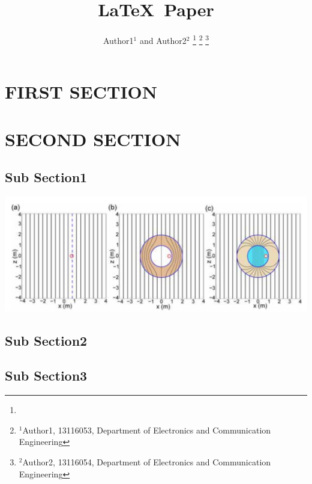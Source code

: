 \documentclass[a4paper, 10pt, conference]{ieeeconf}      %
\title{\LARGE \bf
\LaTeX~Paper
}
\author{Author1$^{1}$ and Author2$^{2}$%
\thanks{}%
\thanks{$^{1}$Author1, 13116053, Department of Electronics and Communication Engineering}%
\thanks{$^{2}$Author2, 13116054, Department of Electronics and Communication Engineering}%
}
\begin{document}
\maketitle
\thispagestyle{empty}
\pagestyle{empty}


\begin{abstract}

 \lipsum[1-2]



\end{abstract}


\section{FIRST SECTION}

\lipsum[1-3]

\section{SECOND SECTION}
\lipsum[1]


\subsection{Sub Section1}

\lipsum[1-3]
\includegraphics[scale=0.25]{1}

\subsection{Sub Section2}

\lipsum[1]



\subsection{Sub Section3}
\lipsum[1-2]
\end{document}
